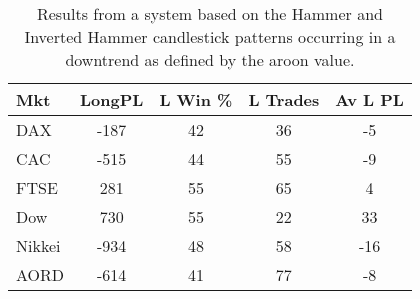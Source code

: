 \begin{table}[ht]
\centering
\caption[Results from a system based on the Hammer and Inverted Hammer candlestick patterns occurring in a downtrend]{Results from a system based on the Hammer and Inverted Hammer candlestick patterns occurring in a downtrend as defined by the aroon value.} 
\label{tab:hammer_aroon_results}
\begin{tabular}{lcccc}
  \toprule Mkt & LongPL & L Win \% & L Trades & Av L PL \\ 
  \midrule DAX & -187 & 42 & 36 & -5 \\ 
  CAC & -515 & 44 & 55 & -9 \\ 
  FTSE & 281 & 55 & 65 & 4 \\ 
  Dow & 730 & 55 & 22 & 33 \\ 
  Nikkei & -934 & 48 & 58 & -16 \\ 
  AORD & -614 & 41 & 77 & -8 \\ 
   \bottomrule \end{tabular}
\end{table}
